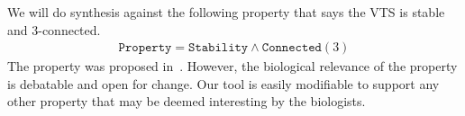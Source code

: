 We will do synthesis against the following property that says the VTS
is stable and 3-connected.
%
%
\begin{align*}
\texttt{Property} =  \texttt{Stability} \land \texttt{Connected}(3) 
\end{align*}
The property was proposed in~\cite{shukla2017discovering}.
%
However, the biological relevance of the property is debatable and open for change.
%
Our tool is easily modifiable to support any other property that may be deemed 
interesting by the biologists.


             
